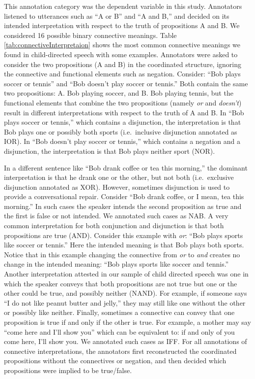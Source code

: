 \documentclass[
  english,
  ,man,floatsintext]{apa6}
\begin{document}
This annotation category was the dependent variable in this study. Annotators listened to utterances such as ``A or B'' and ``A and B,'' and decided on its intended interpretation with respect to the truth of propositions A and B. We considered 16 possible binary connective meanings. Table \ref{tab:connectiveInterpretaion} shows the most common connective meanings we found in child-directed speech with some examples. Annotators were asked to consider the two propositions (A and B) in the coordinated structure, ignoring the connective and functional elements such as negation. Consider: ``Bob plays soccer or tennis'' and ``Bob doesn't play soccer or tennis.'' Both contain the same two propositions: A. Bob playing soccer, and B. Bob playing tennis, but the functional elements that combine the two propositions (namely \emph{or} and \emph{doesn't}) result in different interpretations with respect to the truth of A and B. In ``Bob plays soccer or tennis,'' which contains a disjunction, the interpretation is that Bob plays one or possibly both sports (i.e.~inclusive disjunction annotated as IOR). In ``Bob doesn't play soccer or tennis,'' which contains a negation and a disjunction, the interpretation is that Bob plays neither sport (NOR).

In a different sentence like ``Bob drank coffee or tea this morning,'' the dominant interpretation is that he drank one or the other, but not both (i.e.~exclusive disjunction annotated as XOR). However, sometimes disjunction is used to provide a conversational repair. Consider ``Bob drank coffee, or I mean, tea this morning.'' In such cases the speaker intends the second proposition as true and the first is false or not intended. We annotated such cases as NAB. A very common interpretation for both conjunction and disjunction is that both propositions are true (AND). Consider this example with \emph{or}: ``Bob plays sports like soccer or tennis.'' Here the intended meaning is that Bob plays both sports. Notice that in this example changing the connective from \emph{or} to \emph{and} creates no change in the intended meaning: ``Bob plays sports like soccer and tennis.'' Another interpretation attested in our sample of child directed speech was one in which the speaker conveys that both propositions are not true but one or the other could be true, and possibly neither (NAND). For example, if someone says ``I do not like peanut butter and jelly,'' they may still like one without the other or possibly like neither. Finally, sometimes a connective can convey that one proposition is true if and only if the other is true. For example, a mother may say ``come here and I'll show you'' which can be equivalent to: if and only of you come here, I'll show you. We annotated such cases as IFF. For all annotations of connective interpretations, the annotators first reconstructed the coordinated propositions without the connectives or negation, and then decided which propositions were implied to be true/false.
\end{document}
